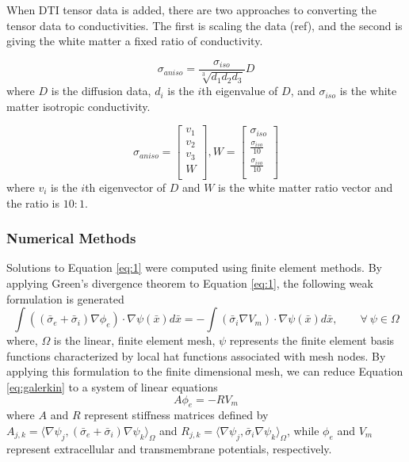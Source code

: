 When DTI tensor data is added, there are two approaches to converting the tensor data to conductivities. The first is scaling the data (ref), and the second is giving the white matter a fixed ratio of conductivity. 

\begin{equation}
\sigma_{aniso} = \frac{\sigma_{iso}}{\sqrt[3]{d_1d_2d_3}}D
\end{equation}
where $D$ is the diffusion data, $d_i$ is the $i$th eigenvalue of $D$, and $\sigma_{iso}$ is the white matter isotropic conductivity.

\begin{equation}
\sigma_{aniso} = \begin{bmatrix}
v_1\\
v_2\\
v_3\\
W\\
\end{bmatrix}, 
W = \begin{bmatrix}
\sigma_{iso}\\
\frac{\sigma_{iso}}{10}\\
\frac{\sigma_{iso}}{10}\\
\end{bmatrix}
\end{equation}
where $v_i$ is the $i$th eigenvector of $D$ and $W$ is the white matter ratio vector and the ratio is $10:1$.

\subsubsection{Numerical Methods}
\label{sec:numerical}


Solutions to Equation \ref{eq:1} were computed using finite element methods.  By applying 
Green's divergence theorem to Equation \ref{eq:1}, the following weak formulation is generated 
\begin{equation}
\int ((\bar{\sigma}_e + \bar{\sigma}_i)\nabla \phi_e) \cdot \nabla \psi(\bar{x})d\bar{x} = - \int (\bar{\sigma}
_i \nabla V_m)\cdot \nabla \psi(\bar{x})d\bar{x}, \quad \quad \forall \ \psi \in \Omega
\label{eq:galerkin}
\end{equation}
where, $\Omega$ is the linear, finite element mesh, $\psi$ represents the finite element basis functions characterized by local hat functions associated with mesh nodes. By applying this formulation to the finite dimensional mesh, we can reduce Equation \ref{eq:galerkin} to a system of linear equations 
\begin{equation}
A \phi_e = -RV_m
\label{eq:ReducedFormula}
\end{equation}
where $A$ and $R$ represent stiffness matrices defined by $A_{j,k} = \langle \nabla \psi_j,(\bar{\sigma}
_e + \bar{\sigma}_i)\nabla \psi_k \rangle_\Omega$ and $R_{j,k} = \langle \nabla \psi_j,\bar{\sigma}_i
\nabla \psi_k \rangle_\Omega$,
while $\phi_e$ and $V_m$ represent extracellular and transmembrane potentials, respectively.\cite{BMB:Wan2013}

